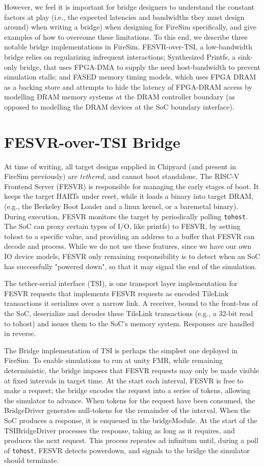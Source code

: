 However, we feel it is important for bridge designers to understand the
constant factors at play (i.e., the expected latencies and bandwidths they must
design around) when writing a bridge) when designing for FireSim specifically,
and give examples of how to overcome these limitations.  To this end, we
describe three notable bridge implementations in FireSim. FESVR-over-TSI, a
low-bandwidth bridge relies on regularizing infrequent interactions;
Synthesized Printfs, a sink-only bridge, that uses FPGA-DMA to supply the need
host-bandwidth to prevent simulation stalls; and FASED memory timing models,
which uses FPGA DRAM as a backing store and attempts to hide the latency of
FPGA-DRAM access by modelling DRAM memory systems at the DRAM controller
boundary (as opposed to modelling the DRAM devices at the SoC boundary
interface).

\section{FESVR-over-TSI Bridge}
At time of writing, all target designs supplied in Chipyard (and present in
FireSim previously) are \emph{tethered}, and cannot boot standalone. The RISC-V
Frontend Server (FESVR) is responsible for managing the early stages of boot.
It keeps the target HARTs under reset, while it loads a binary into target
DRAM, (e.g., the Berkeley Boot Loader\cite{BBL} and a linux kernel, or a
baremetal binary). During execution, FESVR monitors the target by periodically
polling \texttt{tohost}. The SoC can proxy certain types of I/O, like printfs)
to FESVR, by setting tohost to a specific value, and providing an address to a
buffer that FESVR can decode and process. While we do not use these features,
since we have our own IO device models, FESVR only remaining responsibility is
to detect when an SoC has successfully "powered down", so that it may signal
the end of the simulation.

The tether-serial interface (TSI), is one transport layer implementation for
FESVR requests that implements FESVR requests as encoded TileLink transactions
it serializes over a narrow link. A receiver, bound to the front-bus of the
SoC, deserialize and decodes these TileLink transactions (e.g., a 32-bit read
to tohost) and issues them to the SoC's memory system. Responses are handled in
reverse.

The Bridge implementation of TSI is perhaps the simplest one deployed in
FireSim. To enable simulations to run at unity FMR, while remaining
deterministic, the bridge imposes that FESVR requests may only be made visible
at fixed intervals in target time. At the start each interval, FESVR is free to
make a request; the bridge encodes the request into a series of tokens,
allowing the simulator to advance. When tokens for the request have been
consumed, the BridgeDriver generates null-tokens for the remainder of the
interval. When the SoC produces a response, it is enqueued in the bridgeModule.
At the start of the TSIBridgeDriver processes the response, taking as long as
it requires, and produces the next request. This process repeates ad infinitum
until, during a poll of \texttt{tohost}, FESVR detects powerdown, and signals
to the bridge the simulator should terminate.

